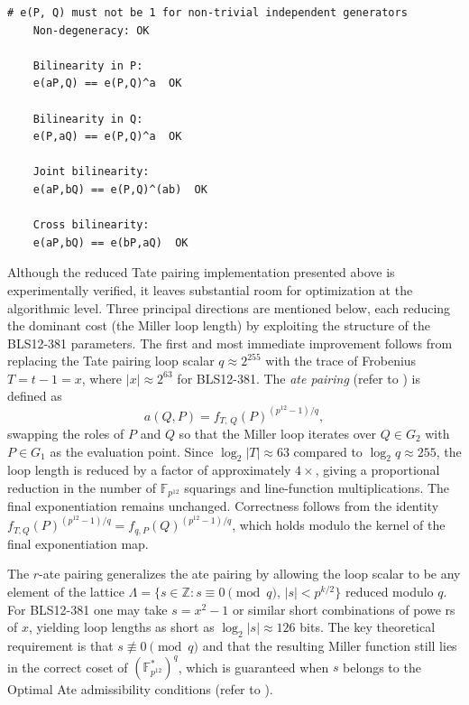 \begin{lstlisting}[caption={Axiomatic test initiated to ensure Tate pairing is correctly implemented. (refer to \refCodeSnippet{apx:code.tateimplementationtest})},label=code:tateimplementok]
	# e(P, Q) must not be 1 for non-trivial independent generators
	Non-degeneracy: OK
	
	Bilinearity in P:
	e(aP,Q) == e(P,Q)^a  OK
	
	Bilinearity in Q:
	e(P,aQ) == e(P,Q)^a  OK
	
	Joint bilinearity:
	e(aP,bQ) == e(P,Q)^(ab)  OK
	
	Cross bilinearity:
	e(aP,bQ) == e(bP,aQ)  OK
\end{lstlisting}
Although the reduced Tate pairing implementation presented above is experimentally verified, it leaves substantial room for optimization at the algorithmic level. Three principal directions are mentioned below, each reducing the dominant cost (the Miller loop length) by exploiting the 
structure of the BLS12-381 parameters.  The first and most immediate improvement follows from replacing the Tate pairing loop scalar $q \approx 2^{255}$ with the trace of
Frobenius $T = t - 1 = x$, where $|x| \approx 2^{63}$ for BLS12-381.
The  \textit{ate pairing} (refer to ) is defined as
\[
a(Q, P) = f_{T,\,Q}(P)^{(p^{12}-1)/q},
\]
swapping the roles of $P$ and $Q$ so that the Miller loop iterates
over $Q \in G_2$ with $P \in G_1$ as the evaluation point. Since $\log_2|T| \approx 63$ compared to $\log_2 q \approx 255$, the loop length is reduced by a factor of approximately $4\times$,
giving a proportional reduction in the number of $\mathbb{F}_{p^{12}}$ squarings and line-function multiplications. The final exponentiation remains unchanged. Correctness follows from the identity
$f_{T,Q}(P)^{(p^{12}-1)/q} = f_{q,P}(Q)^{(p^{12}-1)/q}$, which holds modulo the kernel of the final exponentiation map.

The $r$-ate pairing generalizes the ate pairing by allowing the loop scalar to be any element of the lattice $\Lambda = \{ s \in \mathbb{Z} : s \equiv 0 \pmod{q},\, |s| < p^{k/2} \}$
reduced modulo $q$. For BLS12-381 one may take $s = x^2 - 1$ or similar short
combinations of powe rs of $x$, yielding loop lengths as short as $\log_2|s| \approx 126$ bits.
The key theoretical requirement is that $s \not\equiv 0 \pmod{q}$ and that the resulting Miller function still lies in the correct coset of $(\mathbb{F}_{p^{12}}^*)^q$, which is guaranteed when $s$ belongs to the Optimal Ate admissibility conditions
(refer to \cite{Hess2008PairingLattices}).

